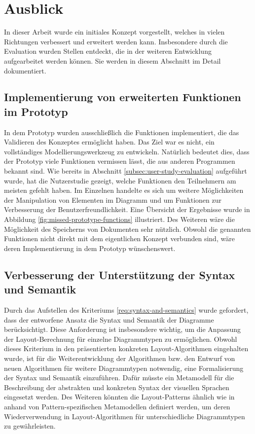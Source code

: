 \section{Ausblick}
\label{sec:outlook}

In dieser Arbeit wurde ein initiales Konzept vorgestellt, welches in vielen Richtungen verbessert und erweitert werden kann. Insbesondere durch die Evaluation wurden Stellen entdeckt, die in der weiteren Entwicklung aufgearbeitet werden können. Sie werden in diesem Abschnitt im Detail dokumentiert.

\subsection{Implementierung von erweiterten Funktionen im Prototyp}
\label{subsec:extension-of-the-prototype}

In dem Prototyp wurden ausschließlich die Funktionen implementiert, die das Validieren des Konzeptes ermöglicht haben. Das Ziel war es nicht, ein vollständiges Modellierungswerkzeug zu entwickeln. Natürlich bedeutet dies, dass der Prototyp viele Funktionen vermissen lässt, die aus anderen Programmen bekannt sind. Wie bereits in Abschnitt \ref{subsec:user-study-evaluation} aufgeführt wurde, hat die Nutzerstudie gezeigt, welche Funktionen den Teilnehmern am meisten gefehlt haben. Im Einzelnen handelte es sich um weitere Möglichkeiten der Manipulation von Elementen im Diagramm und um Funktionen zur Verbesserung der Benutzerfreundlichkeit. Eine Übersicht der Ergebnisse wurde in Abbildung \ref{fig:missed-prototype-functions} illustriert. Des Weiteren wäre die Möglichkeit des Speicherns von Dokumenten sehr nützlich. Obwohl die genannten Funktionen nicht direkt mit dem eigentlichen Konzept verbunden sind, wäre deren Implementierung in dem Prototyp wünschenswert.

\subsection{Verbesserung der Unterstützung der Syntax und Semantik}
\label{subsec:syntax-and-semantics-support-improvements}

Durch das Aufstellen des Kriteriums \ref{req:syntax-and-semantics} wurde gefordert, dass der entworfene Ansatz die Syntax und Semantik der Diagramme berücksichtigt. Diese Anforderung ist insbesondere wichtig, um die Anpassung der Layout-Berechnung für einzelne Diagrammtypen zu ermöglichen. Obwohl dieses Kriterium in den präsentierten konkreten Layout-Algorithmen eingehalten wurde, ist für die Weiterentwicklung der Algorithmen bzw. den Entwurf von neuen Algorithmen für weitere Diagrammtypen notwendig, eine Formalisierung der Syntax und Semantik einzuführen. Dafür müsste ein Metamodell für die Beschreibung der abstrakten und konkreten Syntax der visuellen Sprachen eingesetzt werden. Des Weiteren könnten die Layout-Patterns ähnlich wie in \cite{Maier12A-Pattern-based} anhand von Pattern-spezifischen Metamodellen definiert werden, um deren Wiederverwendung in Layout-Algorithmen für unterschiedliche Diagrammtypen zu gewährleisten.

